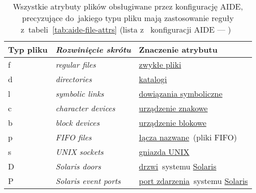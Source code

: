 \documentclass[thesis]{subfiles}
\begin{document}
\newcommand{\regularfilewiki}{\href{https://en.wikipedia.org/wiki/Unix_file_types\#Regular_file}{zwykłe pliki}}
\newcommand{\directorywiki}{\href{https://en.wikipedia.org/wiki/Unix_file_types\#Directory}{katalogi}}
\newcommand{\symlinkwiki}{\href{https://en.wikipedia.org/wiki/Symbolic_link}{dowiązania symboliczne}}
\newcommand{\chardevwiki}{\href{https://en.wikipedia.org/wiki/Device_file\#Character_devices}{urządzenie znakowe}}
\newcommand{\blockdevwiki}{\href{https://en.wikipedia.org/wiki/Device_file\#Block_devices}{urządzenie blokowe}}
\newcommand{\fifofilewiki}{\href{https://en.wikipedia.org/wiki/Named_pipe}{łącza nazwane}}
\newcommand{\unixsocketwiki}{\href{https://en.wikipedia.org/wiki/Unix_domain_socket}{gniazda UNIX}}
\newcommand{\solariswiki}{\href{https://en.wikipedia.org/wiki/Solaris_(operating_system)}{Solaris}}
\newcommand{\solarisdoorwiki}{\href{https://en.wikipedia.org/wiki/Doors_(computing)}{drzwi}}
\newcommand{\solariseventport}{\href{https://solarisrants.wordpress.com/2013/07/24/solaris-file-event-notification/}{port zdarzenia}}

\begin{table}
	\centering
	\footnotesize
	\begin{tabular}{>{\ttfamily}l|>{\itshape}l|l}
		\textnormal{Typ pliku} & \textnormal{Rozwinięcie skrótu} & Znaczenie atrybutu                     \\\hline\hline
		f                      & regular files                   & \regularfilewiki                       \\\hline
		d                      & directories                     & \directorywiki                         \\\hline
		l                      & symbolic links                  & \symlinkwiki                           \\\hline
		c                      & character devices               & \chardevwiki                           \\\hline
		b                      & block devices                   & \blockdevwiki                          \\\hline
		p                      & FIFO files                      & \fifofilewiki~(pliki FIFO)             \\\hline
		s                      & UNIX sockets                    & \unixsocketwiki                        \\\hline
		D                      & Solaris doors                   & \solarisdoorwiki~systemu \solariswiki  \\\hline
		P                      & Solaris event ports             & \solariseventport~systemu \solariswiki
	\end{tabular}
	\caption[Wszystkie atrybuty plików obsługiwane przez konfigurację AIDE, precyzujące do~jakiego typu pliku mają zastosowanie reguły z~tabeli~\ref{tab:aide-file-attrs}]{Wszystkie atrybuty plików obsługiwane przez konfigurację AIDE, precyzujące do~jakiego typu pliku mają zastosowanie reguły z~tabeli~\ref{tab:aide-file-attrs} (lista z~\emph{} konfiguracji AIDE --- )~\cite{aide-manual}}
	\label{tab:aide-file-types}
\end{table}
\end{document}
